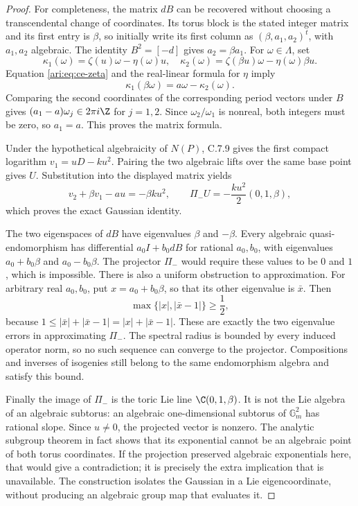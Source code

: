\begin{proof}
For completeness, the matrix $dB$ can be recovered without
choosing a transcendental change of coordinates. Its torus
block is the stated integer matrix and its first entry is
$\beta$, so initially write its first column as
$(\beta,a_1,a_2)^t$, with $a_1,a_2$ algebraic.
The identity $B^2=[-d]$ gives $a_2=\beta a_1$.
For $\omega\in\Lambda$, set
\[
 \kappa_1(\omega)=\zeta(u)\omega-\eta(\omega)u,
 \quad
 \kappa_2(\omega)=\zeta(\beta u)\omega-\eta(\omega)\beta u.
\]
Equation \eqref{ari:eq:ce-zeta} and the real-linear formula for
$\eta$ imply
\[
 \kappa_1(\beta\omega)=a\omega-\kappa_2(\omega).
\]
Comparing the second coordinates of the corresponding period
vectors under $B$ gives
$(a_1-a)\omega_j\in2\pi i\Z$ for $j=1,2$.
Since $\omega_2/\omega_1$ is nonreal, both integers must
be zero, so $a_1=a$. This proves the matrix formula.

Under the hypothetical algebraicity of $N(P)$, C.7.9 gives
the first compact logarithm $v_1=uD-ku^2$. Pairing the
two algebraic lifts over the same base point gives $U$.
Substitution into the displayed matrix yields
\[
 v_2+\beta v_1-au=-\beta ku^2,
 \qquad
 \Pi_-U=-\frac{ku^2}{2}(0,1,\beta),
\]
which proves the exact Gaussian identity.

The two eigenspaces of $dB$ have eigenvalues $\beta$ and
$-\beta$. Every algebraic quasi-endomorphism has differential
$a_0I+b_0dB$ for rational $a_0,b_0$, with eigenvalues
$a_0+b_0\beta$ and $a_0-b_0\beta$. The projector
$\Pi_-$ would require these values to be $0$ and $1$,
which is impossible. There is also a uniform obstruction to
approximation. For arbitrary real $a_0,b_0$, put
$x=a_0+b_0\beta$, so that its other eigenvalue is
$\bar x$. Then
\begin{equation}\label{ari:eq:ce-gap}
 \max\{|x|,|\bar x-1|\}\ge\frac12,
\end{equation}
because $1\le|\bar x|+|\bar x-1|=|x|+|\bar x-1|$.
These are exactly the two eigenvalue errors in approximating
$\Pi_-$. The spectral radius is bounded by every induced
operator norm, so no such sequence can converge to the
projector. Compositions and inverses of isogenies still belong
to the same endomorphism algebra and satisfy this bound.

Finally the image of $\Pi_-$ is the toric Lie line
$\C(0,1,\beta)$. It is not the Lie algebra of an algebraic
subtorus: an algebraic one-dimensional subtorus of
$\mathbb G_m^2$ has rational slope. Since $u\ne0$,
the projected vector is nonzero. The analytic subgroup
theorem in fact shows that its exponential cannot be an
algebraic point of both torus coordinates. If the projection
preserved algebraic exponentials here, that would give a
contradiction; it is precisely the extra implication that
is unavailable. The construction isolates the Gaussian in
a Lie eigencoordinate, without producing an algebraic
group map that evaluates it.
\end{proof}

